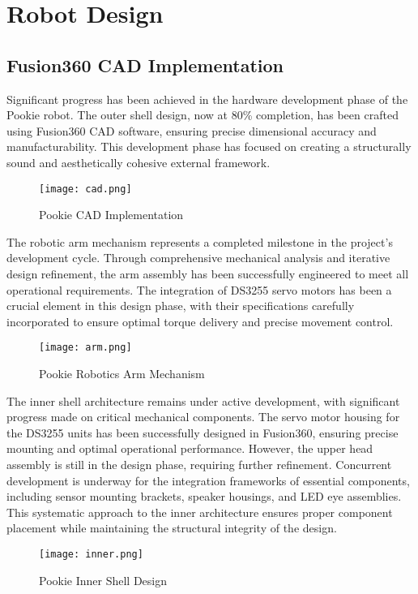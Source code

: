 \section{Robot Design}
\subsection{Fusion360 CAD Implementation}
Significant progress has been achieved in the hardware development phase of the Pookie robot. The outer shell design, now at 80\% completion, has been crafted using Fusion360 CAD software, ensuring precise dimensional accuracy and manufacturability. This development phase has focused on creating a structurally sound and aesthetically cohesive external framework.

\begin{figure}[ht]
    \centering
    \captionsetup{justification=centering}
    \texttt{[image: cad.png]}
    \caption{Pookie CAD Implementation}
    \label{fig:cad}
\end{figure}

The robotic arm mechanism represents a completed milestone in the project's development cycle. Through comprehensive mechanical analysis and iterative design refinement, the arm assembly has been successfully engineered to meet all operational requirements. The integration of DS3255 servo motors has been a crucial element in this design phase, with their specifications carefully incorporated to ensure optimal torque delivery and precise movement control.

\begin{figure}[ht]
    \centering
    \captionsetup{justification=centering}
    \texttt{[image: arm.png]}
    \caption{Pookie Robotics Arm Mechanism}
    \label{fig:arm}
\end{figure}

\newpage
The inner shell architecture remains under active development, with significant progress made on critical mechanical components. The servo motor housing for the DS3255 units has been successfully designed in Fusion360, ensuring precise mounting and optimal operational performance. However, the upper head assembly is still in the design phase, requiring further refinement. Concurrent development is underway for the integration frameworks of essential components, including sensor mounting brackets, speaker housings, and LED eye assemblies. This systematic approach to the inner architecture ensures proper component placement while maintaining the structural integrity of the design.

\begin{figure}[ht]
    \centering
    \captionsetup{justification=centering}
    \texttt{[image: inner.png]}
    \caption{Pookie Inner Shell Design}
    \label{fig:inner}
\end{figure}
